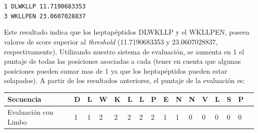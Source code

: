 	\texttt{1 DLWKLLP 11.7190683353}   \\
\indent \texttt{3 WKLLPEN 23.0607028837} 

Este resultado indica que los heptapéptidos DLWKLLP y el WKLLPEN, poseen valores de score superior al \textit{threshold} (11.7190683353 y 23.0607028837, respectivamente).
Utilizando nuestro sistema de evaluación, se aumenta en 1 el puntaje de todas las posiciones asociadas a cada (tener en cuenta que algunas posiciones pueden sumar mas de 1 ya que los heptapéptidos pueden estar solapados).
A partir de los resultados anteriores, el puntaje de la evaluación es:

\vspace{0.5cm}
\noindent
\begin{tabular}{llllllllllllllll} 
\hline      		
Secuencia & \textbf{D} & \textbf{L} & \textbf{W} & \textbf{K} & \textbf{L} & \textbf{L} & \textbf{P} & \textbf{E} & \textbf{N} & \textbf{N} & \textbf{V} & \textbf{L} & \textbf{S} & \textbf{P} \\ \hline
Evaluación con Limbo & 1 & 1 & 2 & 2 & 2 & 2 & 2 & 1 & 1 & 0 & 0 & 0 & 0 & 0 \\ \hline
\end{tabular}







